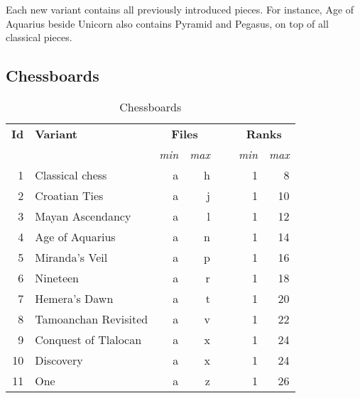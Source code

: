 Each new variant contains all previously introduced pieces. For instance, Age of Aquarius
beside Unicorn also contains Pyramid and Pegasus, on top of all classical pieces.

\clearpage %

\subsection*{Chessboards}
\label{sec:Appendix/Introduction/Chessboards}

\begin{table}[!h]
\centering
\begin{tabular}{ rlrrcrr }
\toprule
\textbf{Id} & \textbf{Variant}      & \multicolumn{2}{c}{ \textbf{Files} } & ~ & \multicolumn{2}{c}{ \textbf{Ranks} }   \\ \cmidrule{3-4} \cmidrule{6-7}
            &                       & \emph{min} & \emph{max}              &   & \emph{min} & \emph{max}                \\
\midrule
          1 & Classical chess       & a          & h                       &   & 1          &  8                        \\ %
          2 & Croatian Ties         & a          & j                       &   & 1          & 10                        \\
          3 & Mayan Ascendancy      & a          & l                       &   & 1          & 12                        \\
          4 & Age of Aquarius       & a          & n                       &   & 1          & 14                        \\
          5 & Miranda's Veil        & a          & p                       &   & 1          & 16                        \\
          6 & Nineteen              & a          & r                       &   & 1          & 18                        \\
          7 & Hemera's Dawn         & a          & t                       &   & 1          & 20                        \\
          8 & Tamoanchan Revisited  & a          & v                       &   & 1          & 22                        \\
          9 & Conquest of Tlalocan  & a          & x                       &   & 1          & 24                        \\
         10 & Discovery             & a          & x                       &   & 1          & 24                        \\
         11 & One                   & a          & z                       &   & 1          & 26                        \\
\bottomrule
\end{tabular}
\caption{Chessboards}
\label{tbl:Appendix/Introduction/Chessboards}
\end{table}

